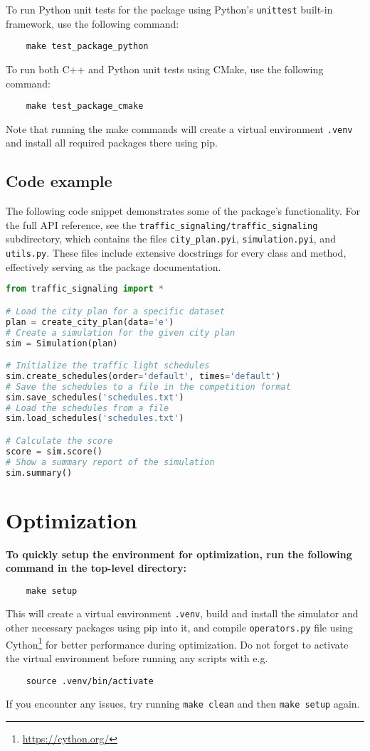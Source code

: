 \bigskip

To run Python unit tests for the package using Python's \verb|unittest| built-in framework, use the following command:
\begin{verbatim}
    make test_package_python
\end{verbatim}
To run both C++ and Python unit tests using CMake, use the following command:
\begin{verbatim}
    make test_package_cmake
\end{verbatim}
Note that running the make commands will create a virtual environment \verb|.venv| and install all required packages there using pip.

\subsection{Code example}

The following code snippet demonstrates some of the package's functionality. 
For the full API reference, see the \verb|traffic_signaling/traffic_signaling| subdirectory, which contains the files \verb|city_plan.pyi|, \verb|simulation.pyi|, and \verb|utils.py|. These files include extensive docstrings for every class and method, effectively serving as the package documentation.

\begin{lstlisting}[language=Python]
from traffic_signaling import *

# Load the city plan for a specific dataset
plan = create_city_plan(data='e')
# Create a simulation for the given city plan
sim = Simulation(plan)

# Initialize the traffic light schedules
sim.create_schedules(order='default', times='default')
# Save the schedules to a file in the competition format
sim.save_schedules('schedules.txt')
# Load the schedules from a file
sim.load_schedules('schedules.txt')

# Calculate the score
score = sim.score()
# Show a summary report of the simulation
sim.summary()
\end{lstlisting}

\bigskip

\section{Optimization} \label{sec:optimization}

\textbf{To quickly setup the environment for optimization, run the following command in the top-level directory:}
\begin{verbatim}
    make setup
\end{verbatim}
This will create a virtual environment \verb|.venv|, build and install the simulator and other necessary packages using pip into it, and compile \verb|operators.py| file using Cython\footnote{\url{https://cython.org/}} for better performance during optimization. Do not forget to activate the virtual environment before running any scripts with e.g.
\begin{verbatim}
    source .venv/bin/activate
\end{verbatim}
If you encounter any issues, try running \verb|make clean| and then \verb|make setup| again.

